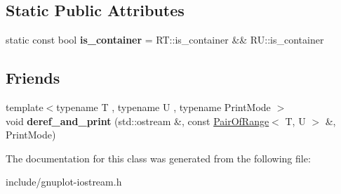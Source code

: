 \subsection*{Static Public Attributes}
\begin{DoxyCompactItemize}
\item 
\mbox{\label{classgnuplotio_1_1PairOfRange_ab49c6567f0fa6a82fa2a6245fd964659}} 
static const bool {\bfseries is\+\_\+container} = R\+T\+::is\+\_\+container \&\& R\+U\+::is\+\_\+container
\end{DoxyCompactItemize}
\subsection*{Friends}
\begin{DoxyCompactItemize}
\item 
\mbox{\label{classgnuplotio_1_1PairOfRange_aada62f803432f04aff66f3c609329520}} 
{\footnotesize template$<$typename T , typename U , typename Print\+Mode $>$ }\\void {\bfseries deref\+\_\+and\+\_\+print} (std\+::ostream \&, const \hyperlink{classgnuplotio_1_1PairOfRange}{Pair\+Of\+Range}$<$ T, U $>$ \&, Print\+Mode)
\end{DoxyCompactItemize}


The documentation for this class was generated from the following file\+:\begin{DoxyCompactItemize}
\item 
include/gnuplot-\/iostream.\+h\end{DoxyCompactItemize}

